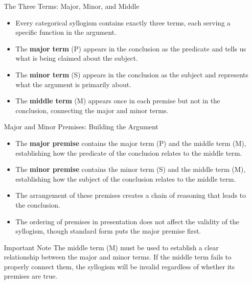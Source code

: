 \documentclass{beamer}
\begin{document}
	\begin{frame}{The Three Terms: Major, Minor, and Middle}
		\begin{itemize}
			\item Every categorical syllogism contains exactly three terms, each serving a specific function in the argument.
			\item The \textbf{major term} (P) appears in the conclusion as the predicate and tells us what is being claimed about the subject.
			\item The \textbf{minor term} (S) appears in the conclusion as the subject and represents what the argument is primarily about.
			\item The \textbf{middle term} (M) appears once in each premise but not in the conclusion, connecting the major and minor terms.
		\end{itemize}
		
		\begin{center}
		\end{center}
	\end{frame}
	
	\begin{frame}{Major and Minor Premises: Building the Argument}
		\begin{itemize}
			\item The \textbf{major premise} contains the major term (P) and the middle term (M), establishing how the predicate of the conclusion relates to the middle term.
			\item The \textbf{minor premise} contains the minor term (S) and the middle term (M), establishing how the subject of the conclusion relates to the middle term.
			\item The arrangement of these premises creates a chain of reasoning that leads to the conclusion.
			\item The ordering of premises in presentation does not affect the validity of the syllogism, though standard form puts the major premise first.
		\end{itemize}
		
		\begin{alertblock}{Important Note}
			The middle term (M) must be used to establish a clear relationship between the major and minor terms. If the middle term fails to properly connect them, the syllogism will be invalid regardless of whether its premises are true.
		\end{alertblock}
	\end{frame}
	
\end{document}
